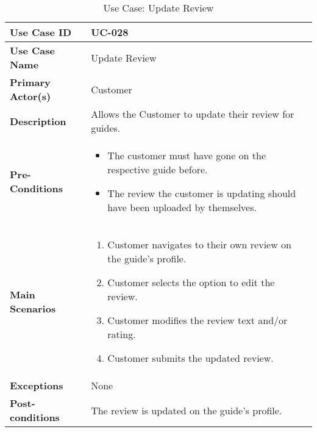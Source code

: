\begin{table}[ht]
    \centering
    \begin{tabular}{|l|p{}|}
        \hline
        \textbf{Use Case ID} & UC-028 \\
        \hline
        \textbf{Use Case Name} & Update Review \\
        \hline
        \textbf{Primary Actor(s)} & Customer \\
        \hline
        \textbf{Description} & Allows the Customer to update their review for guides. \\
        \hline
        \textbf{Pre-Conditions} & 
        \begin{itemize}[itemsep=0pt]
            \item The customer must have gone on the respective guide before.
            \item The review the customer is updating should have been uploaded by themselves.
        \end{itemize} \\
        \hline
        \textbf{Main Scenarios} & 
        \begin{enumerate}[label=\arabic*.,itemsep=0pt]
            \item Customer navigates to their own review on the guide's profile.
            \item Customer selects the option to edit the review.
            \item Customer modifies the review text and/or rating.
            \item Customer submits the updated review.
        \end{enumerate} \\
        \hline
        \textbf{Exceptions} & None \\
        \hline
        \textbf{Post-conditions} & The review is updated on the guide's profile. \\
        \hline
    \end{tabular}
    \label{tab:use-case-update-review}
    \caption{Use Case: Update Review}
\end{table}


